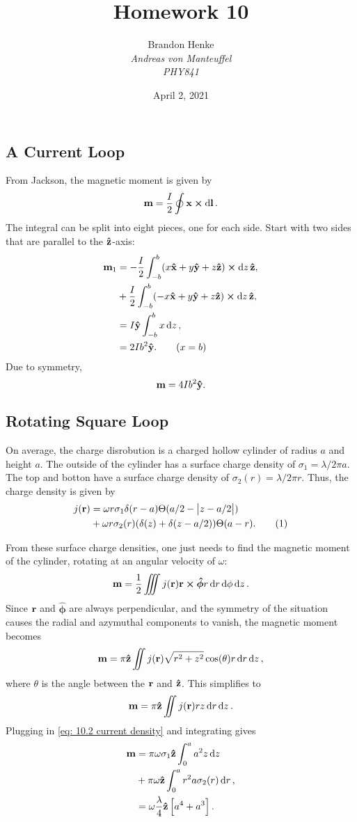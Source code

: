 \documentclass{article}
\title{Homework 10}
\author{Brandon Henke\\\textit{Andreas von Manteuffel}\\\textit{PHY841}}
\date{April 2, 2021}
\begin{document}
\maketitle
\begin{multicols*}{2}

	\subsection{A Current Loop}
	From Jackson, the magnetic moment is given by
	\[
		\vb{m} = \frac{I}{2} \oint \vb{x} \cross \dd{\vb{l}}.
	\]
	The integral can be split into eight pieces, one for each side.
	Start with two sides that are parallel to the $\vu{z}$-axis:
	\begin{align*}
		\vb{m}_1 &= -\frac{I}{2}\int_{-b}^{b} (x\vu{x}+y\vu{y}+z\vu{z})\cross \dd{z}\vu{z},\\
		&+ \frac{I}{2}\int_{-b}^{b} (-x\vu{x}+y\vu{y}+z\vu{z})\cross \dd{z}\vu{z},\\
		&= I \vu{y} \int_{-b}^b x \dd{z},\\
		&= 2I b^2 \vu{y}.\qquad (x=b)
	\end{align*}
	Due to symmetry,
	\[
		\vb{m} = 4Ib^2\vu{y}.
	\]
	\subsection{Rotating Square Loop}
	On average, the charge disrobution is a charged hollow cylinder of radius $a$ and height $a$.
	The outside of the cylinder has a surface charge density of $\sigma_1=\lambda/2\pi a$.
	The top and botton have a surface charge density of $ \sigma_2(r)=\lambda/2\pi r $.
	Thus, the charge density is given by
	\begin{align*}
		j(\vb{r}) &= \omega r \sigma_1 \delta(r-a)\Theta(a/2-\abs{z-a/2})\\
		&+\omega r\sigma_2(r)(\delta(z)+\delta(z-a/2))\Theta(a-r).
		\stepcounter{equation}
		\tag{\theequation}
		\label{eq: 10.2 current density}
	\end{align*}

	From these surface charge densities, one just needs to find the magnetic moment of the cylinder, rotating at an angular velocity of $\omega$:
	\[
		\vb{m} = \frac{1}{2} \iiint j(\vb{r}) \vb{r} \cross \bm{\hat{\phi}} r \dd{r}\dd{\phi}\dd{z}.
	\]
	Since $\vb{r}$ and $\bm{\hat\phi}$ are always perpendicular, and the symmetry of the situation causes the radial and azymuthal components to vanish, the magnetic moment becomes
	\[
		\vb{m} = \pi\vu{z} \iint j(\vb{r}) \sqrt{r^2+z^2}\cos(\theta) r\dd{r}\dd{z},
	\]
	where $\theta$ is the angle between the $\vb{r}$ and $\vu{z}$.
	This simplifies to
	\[
		\vb{m} = \pi\vu{z} \iint j(\vb{r}) rz \dd{r}\dd{z}.
	\]
	Plugging in \ref{eq: 10.2 current density} and integrating gives
	\begin{align*}
		\vb{m} &= \pi \omega \sigma_1 \vu{z} \int_{0}^{a} a^2z \dd{z}\\
		&+ \pi \omega \vu{z} \int_{0}^{a} r^2a \sigma_2(r) \dd{r},\\
		&= \omega \frac{\lambda}{4} \vu{z}\left[ a^4 + a^3 \right].
	\end{align*}


\end{multicols*}
\end{document}
